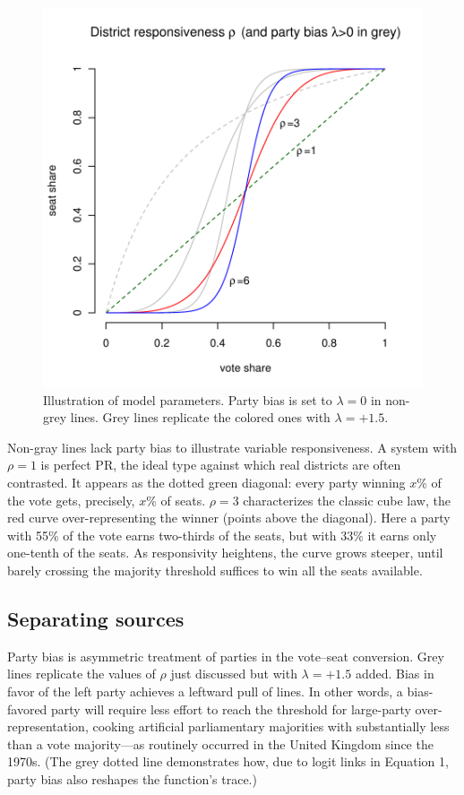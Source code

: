 \documentclass[letter,12pt]{article}
\begin{document}
\begin{figure}
\begin{center}
    \includegraphics[width=.55\columnwidth]{rhoExample.pdf} 
\caption{Illustration of model parameters. Party bias is set to $\lambda=0$ in non-grey lines. Grey lines replicate the colored ones with $\lambda=+1.5$.}\label{F:lambdaRhoEx}
\end{center}
\end{figure}

Non-gray lines lack party bias to illustrate variable responsiveness. A system with $\rho=1$ is perfect PR, the ideal type against which real districts are often contrasted. It appears as the dotted green diagonal: every party winning $x$\% of the vote gets, precisely, $x$\% of seats. $\rho=3$ characterizes the classic cube law, the red curve over-representing the winner (points above the diagonal). Here a party with 55\% of the vote earns two-thirds of the seats, but with 33\% it earns only one-tenth of the seats. As responsivity heightens, the curve grows steeper, until barely crossing the majority threshold suffices to win all the seats available. 

\subsection{Separating sources}

Party bias is asymmetric treatment of parties in the vote--seat conversion. Grey lines replicate the values of $\rho$ just discussed but with $\lambda = +1.5$ added. Bias in favor of the left party achieves a leftward pull of lines. In other words, a bias-favored party will require less effort to reach the threshold for large-party over-representation, cooking artificial parliamentary majorities with substantially less than a vote majority---as routinely occurred in the United Kingdom since the 1970s. (The grey dotted line demonstrates how, due to logit links in Equation 1, party bias also reshapes the function's trace.) %
\end{document}
